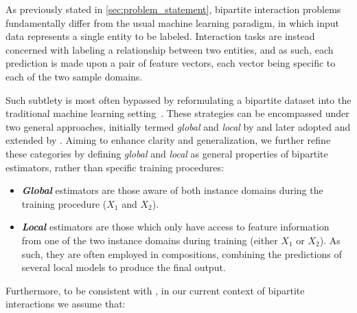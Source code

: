 As previously stated in \autoref{sec:problem_statement}, bipartite interaction problems fundamentally differ from the usual machine learning paradigm, in which input data represents a single entity to be labeled. Interaction tasks are instead concerned with labeling a relationship between two entities, and as such, each prediction is made upon a pair of feature vectors, each vector being specific to each of the two sample domains.

Such subtlety is most often bypassed by reformulating a bipartite dataset into the traditional machine learning setting~\cite{vert2008reconstruction}.
%
These strategies can be encompassed under two general approaches, initially termed \emph{global} and \emph{local} by \textcite{vert2008reconstruction} and later adopted and extended by \textcite{sschrynemackers2015}.  %
Aiming to enhance clarity and generalization, we further refine these categories by defining \emph{global} and \emph{local} as general properties of bipartite estimators, rather than specific training procedures:

\begin{itemize}
    \item \emph{\textbf{Global}} estimators are those aware of both instance domains during the training procedure ($X_1$ and $X_2$).
    \item \emph{\textbf{Local}} estimators are those which only have access to feature information from one of the two instance domains during training (either $X_1$ or $X_2$).
    As such, they are often employed in compositions, combining the predictions of several local models to produce the final output.
\end{itemize}

Furthermore, to be consistent with \textcite{pliakos2018,pliakos2019,pliakos2020}, in our current context of bipartite interactions we assume that:

